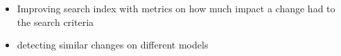 
\begin{itemize}
	\item Improving search index with metrics on how much impact a change had to the search criteria
	\item detecting similar changes on different models
\end{itemize}
